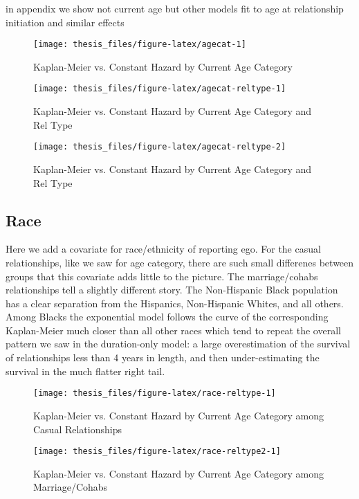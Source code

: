 \documentclass [11pt, proquest] {uwthesis}[2015/03/03]
\begin{document}
in appendix we show not current age but other models fit to age at
relationship initiation and similar effects
\begin{figure}

{\centering \texttt{[image: thesis\_files/figure-latex/agecat-1]} 

}

\caption{Kaplan-Meier vs. Constant Hazard by Current Age Category}\label{fig:agecat}
\end{figure}
\begin{figure}

{\centering \texttt{[image: thesis\_files/figure-latex/agecat-reltype-1]} 

}

\caption{Kaplan-Meier vs. Constant Hazard by Current Age Category and Rel Type}\label{fig:agecat-reltype-1}
\end{figure}\begin{figure}
{\centering \texttt{[image: thesis\_files/figure-latex/agecat-reltype-2]} 

}

\caption{Kaplan-Meier vs. Constant Hazard by Current Age Category and Rel Type}\label{fig:agecat-reltype-2}
\end{figure}
\subsection{Race}\label{race}

Here we add a covariate for race/ethnicity of reporting ego. For the
casual relationships, like we saw for age category, there are such small
differenes between groups that this covariate adds little to the
picture. The marriage/cohabs relationships tell a slightly different
story. The Non-Hispanic Black population has a clear separation from the
Hispanics, Non-Hispanic Whites, and all others. Among Blacks the
exponential model follows the curve of the corresponding Kaplan-Meier
much closer than all other races which tend to repeat the overall
pattern we saw in the duration-only model: a large overestimation of the
survival of relationships less than 4 years in length, and then
under-estimating the survival in the much flatter right tail.
\begin{figure}

{\centering \texttt{[image: thesis\_files/figure-latex/race-reltype-1]} 

}

\caption{Kaplan-Meier vs. Constant Hazard by Current Age Category among Casual Relationships}\label{fig:race-reltype}
\end{figure}
\begin{figure}

{\centering \texttt{[image: thesis\_files/figure-latex/race-reltype2-1]} 

}

\caption{Kaplan-Meier vs. Constant Hazard by Current Age Category among Marriage/Cohabs}\label{fig:race-reltype2}
\end{figure}
\end{document}

